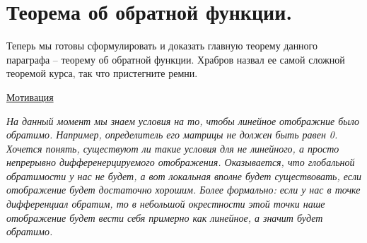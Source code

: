 \section{Теорема об обратной функции.}

Теперь мы готовы сформулировать и доказать главную теорему данного параграфа -- теорему об обратной функции.
Храбров назвал ее самой сложной теоремой курса, так что пристегните ремни.

\underline{Мотивация}

\quad \textit{На данный момент мы знаем условия на то, чтобы линейное отображние было обратимо.
Например, определитель его матрицы не должен быть равен 0. 
Хочется понять, существуют ли такие условия для не линейного, а просто непрерывно дифференерцируемого отображения.
Оказывается, что глобальной обратимости у нас не будет, а вот локальная вполне будет существовать, если отображение будет достаточно хорошим.
Более формально: если у нас в точке дифференциал обратим, то в небольшой окрестности этой точки наше отображение будет вести себя примерно как линейное, а значит будет обратимо.}

